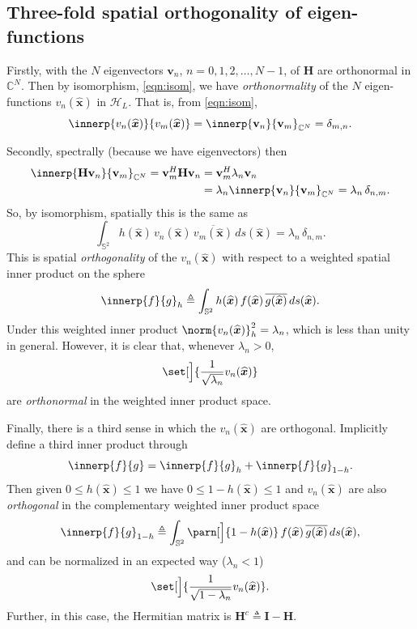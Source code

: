 \documentclass[10pt, twocolumn, twoside]{IEEEtran}
\newcommand{\untsph}{\mathbb{S}^{2}} %
\newcommand{\unit}[1]{\widehat{\bm{#1}}}
\newcommand{\cmplx}{\mathbb{C}} %
\newcommand{\dfn}{\triangleq}
\newcommand{\conj}[1]{\overline{#1}} %
\begin{document}
\subsection{Three-fold spatial orthogonality of eigen-functions}

Firstly, with the $N$ eigenvectors $\mathbf{v}_n$, $n=0,1,2,\dotsc,N-1$, of $\mathbf{H}$ are orthonormal in $\cmplx^N$.  Then by isomorphism, \eqref{eqn:isom}, we have \emph{orthonormality} of the $N$ eigen-functions $v_n(\unit{x})$ in $\mathcal{H}_{L}$.  That is, from \eqref{eqn:isom},
\[
	\innerp{v_n(\unit{x})}{v_m(\unit{x})}
	=\innerp{\mathbf{v}_n}{\mathbf{v}_m}_{\cmplx^N}
	=\delta_{m,n}.
\]

Secondly, spectrally (because we have eigenvectors) then
\begin{align*}
	\innerp{\mathbf{H}\mathbf{v}_n}{\mathbf{v}_m}_{\cmplx^N}
	=\mathbf{v}_m^H\mathbf{H}\mathbf{v}_n
	&=\mathbf{v}_m^H\lambda_n\mathbf{v}_n \\
	&=\lambda_n\innerp{\mathbf{v}_n}{\mathbf{v}_m}_{\cmplx^N}
	=\lambda_n\,\delta_{n,m}.
\end{align*}
So, by isomorphism, spatially this is the same as
\[
	\int_{\untsph} h(\unit{x})\,v_n(\unit{x})\,
		\conj{v_m(\unit{x})}\,ds(\unit{x})=\lambda_n\,\delta_{n,m}.
\]
This is spatial \emph{orthogonality} of the $v_n(\unit{x})$ with respect to a weighted spatial inner product on the sphere
\[
	\innerp{f}{g}_{h}\dfn\int_{\untsph} h(\unit{x})\,f(\unit{x})\,
		\conj{g(\unit{x})}\,ds(\unit{x}).
\]
Under this weighted inner product $\norm{v_n(\unit{x})}^2_{h}=\lambda_n$, which is less than unity in general.  However, it is clear that, whenever $\lambda_n>0$,
\[
	\set[\Big]{\frac{1}{\sqrt{\lambda_n}}v_n(\unit{x})}
\]
are \emph{orthonormal} in the weighted inner product space.

Finally, there is a third sense in which the $v_n(\unit{x})$ are orthogonal.  Implicitly define a third inner product through
\[
	\innerp{f}{g}=\innerp{f}{g}_{h}+\innerp{f}{g}_{1-h}.
\]
Then given $0\leq h(\unit{x})\leq1$ we have $0\leq1-h(\unit{x})\leq1$ and $v_n(\unit{x})$ are also \emph{orthogonal} in the complementary weighted inner product space
\[
	\innerp{f}{g}_{1-h}\dfn\int_{\untsph} \parn[\Big]{1-h(\unit{x})}\,f(\unit{x})\,
		\conj{g(\unit{x})}\,ds(\unit{x}),
\]
and can be normalized in an expected way ($\lambda_n<1$)
\[
	\set[\Big]{\frac{1}{\sqrt{1-\lambda_n}}v_n(\unit{x})}.
\]
Further, in this case, the Hermitian matrix is $\mathbf{H}^{c}\dfn\mathbf{I}-\mathbf{H}$.
\end{document}
